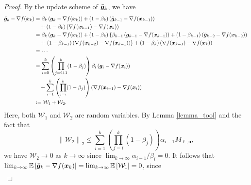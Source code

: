 \documentclass[aos]{imsart}
\numberwithin{equation}{section}
\theoremstyle{plain}
\begin{document}
\begin{appendix}
\begin{proof}
By the update scheme of $\Bar{\bm{g}}_{k}$, we have
    \begin{equation*}
        \begin{split}
            \Bar{\bm{g}}_{k} - \nabla f(\bm{x}_k) & = \beta_k \left( \bm{g}_k - \nabla f(\bm{x}_k) \right) + (1-\beta_k) \left( \Bar{\bm{g}}_{k-1} - \nabla f(\bm{x}_{k-1}) \right) \\
            & \hspace{1em} + (1-\beta_k) \left( \nabla f(\bm{x}_{k-1}) - \nabla f(\bm{x}_k) \right)\\
            & = \beta_k \left( \bm{g}_k - \nabla f(\bm{x}_k) \right) + (1-\beta_k)  \left\{ \beta_{k-1} \left( \bm{g}_{k-1} - \nabla f(\bm{x}_{k-1}) \right)  + (1-\beta_{k-1}) \left( \Bar{\bm{g}}_{k-2} - \nabla f(\bm{x}_{k-2}) \right) \right.\\
            & \hspace{1em} + \left. (1-\beta_{k-1}) \left( \nabla f(\bm{x}_{k-2}) - \nabla f(\bm{x}_{k-1}) \right) \right\} + (1-\beta_k) \left( \nabla f(\bm{x}_{k-1}) - \nabla f(\bm{x}_k) \right) \\
            & = \cdots\\
            & = \sum_{i=0}^{k} \left( \prod_{j=i+1}^{k} (1-\beta_j) \right) \beta_i \left( \bm{g}_{i} - \nabla f(\bm{x}_{i}) \right) \\
            & \hspace{1em} + \sum_{i=1}^{k} \left( \prod_{j=i}^{k} (1-\beta_j) \right) \left( \nabla f(\bm{x}_{i-1}) - \nabla f(\bm{x}_{i}) \right) \\
            & := \mathcal{W}_1 + \mathcal{W}_2.
        \end{split}
    \end{equation*}
    Here, both $\mathcal{W}_1$ and $\mathcal{W}_2$ are random variables. By Lemma \ref{lemma_tool} and the fact that 
    \begin{equation*}
        \left\|\mathcal{W}_2\right\|_2 \leq \sum_{i=1}^{k} \left( \prod_{j=i}^{k} (1-\beta_j) \right) \alpha_{i-1} M_{\bm{\ell},\bm{u}},
    \end{equation*}
    we have $\mathcal{W}_2 \to 0$ as $k \to \infty$ since $\lim_{k \to \infty} \alpha_{i-1}/\beta_i = 0$. It follows that $\lim_{k \to \infty} \mathbb{E} \left[ \Bar{\bm{g}}_{k} - \nabla f(\bm{x}_k) \right] = \lim_{k \to \infty} \mathbb{E} \left[ \mathcal{W}_1 \right] = 0$, since
    \begin{equation*}
        \begin{split}

\end{split}
\end{equation*}
\end{proof}
\end{appendix}
\end{document}
